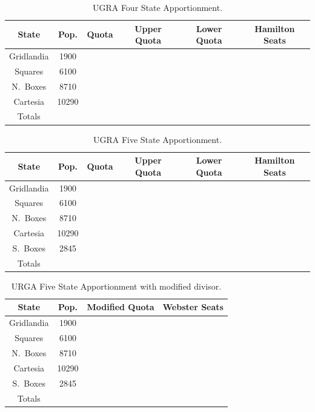 	\begin{small}
		\begin{table}[!ht]
			\centering
			\renewcommand{\arraystretch}{1.5}
			\begin{tabular}{|c | c | c | c | c | c |}
				\hline
				State & Pop. & Quota & Upper Quota & Lower Quota & Hamilton Seats \\
				\hline
				Gridlandia & 1900 & \phantom{ 7.03 } & & & \\
				\hline
				Squares & 6100 & \phantom{22.59} & & & \\
				\hline
				N.\ Boxes & 8710 & \phantom{32.26} & & & \\
				\hline
				Cartesia & 10290 & \phantom{Upper Quota} & & & \\
				\hline
				Totals & & & & & \\
				\hline
			\end{tabular}
			\caption{UGRA Four State Apportionment.}
			\label{tab:four_states}
		\end{table}

		\begin{table}[!ht]
			\centering
			\renewcommand{\arraystretch}{1.5}
			\begin{tabular}{|c | c | c | c | c | c |}
				\hline
				State & Pop. & Quota & Upper Quota & Lower Quota & Hamilton Seats \\
				\hline
				Gridlandia & 1900 & \phantom{ 7.03 } & & & \\
				\hline
				Squares & 6100 & \phantom{22.59} & & & \\
				\hline
				N.\ Boxes & 8710 & \phantom{32.26} & & & \\
				\hline
				Cartesia & 10290 & \phantom{Upper Quota} & & & \\
				\hline
				S.\ Boxes & 2845 & \phantom{10.48}  & & & \\
				\hline
				Totals & & & & & \\
				\hline
			\end{tabular}
			\caption{UGRA Five State Apportionment.}
			\label{tab:five_states}
		\end{table}

		\begin{table}[!ht]
			\centering
			\renewcommand{\arraystretch}{1.5}
			\begin{tabular}{|c | c | c | c |}
				\hline
				State & Pop. & Modified Quota & Webster Seats \\
				\hline
				Gridlandia & 1900 & \phantom{ 7.03/7.00 } & \\
				\hline
				Squares & 6100 & \phantom{22.59/22.48} &  \\
				\hline
				N.\ Boxes & 8710 & \phantom{32.26/32.10} & \\
				\hline
				Cartesia & 10290 & \phantom{ 38.11 / 37.92} &\\
				\hline
				S.\ Boxes & 2845 & \phantom{10.48}  & \\
				\hline
				Totals & & & \\
				\hline
				\end{tabular}
			\caption{URGA Five State Apportionment with modified divisor.}
			\label{tab:five_states_with_modified_divisor}
		\end{table}
	\end{small}
